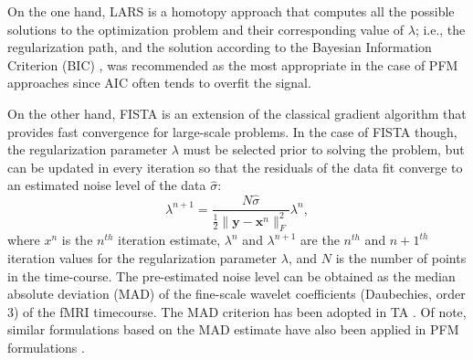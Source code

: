 On the one hand, LARS is a homotopy approach that computes all the possible
solutions to the optimization problem and their corresponding value of
$\lambda$; i.e., the regularization path, and the solution according to the
Bayesian Information Criterion (BIC)
\citep{Schwarz1978EstimatingDimensionModel}, was recommended as the most
appropriate in the case of PFM approaches since AIC often tends to overfit the
signal\citep{Gaudes2013Paradigmfreemapping,CaballeroGaudes2019deconvolutionalgorithmmulti}.

On the other hand, FISTA is an extension of the classical gradient algorithm
that provides fast convergence for large-scale problems. In the case of FISTA
though, the regularization parameter $\lambda$ must be selected prior to solving
the problem, but can be updated in every iteration so that the residuals of the
data fit converge to an estimated noise level of the data $\hat{\sigma}$:
\begin{equation}
    \lambda^{n+1} = \frac{N \hat{\sigma}}{\frac{1}{2} \| \mathbf{y} - \mathbf{x}^n \|_F^2} \lambda^n,
\label{eq:std}
\end{equation}
where $x^n$ is the $n^{th}$ iteration estimate, $\lambda^n$ and $\lambda^{n+1}$
are the $n^{th}$ and $n+1^{th}$ iteration values for the regularization
parameter $\lambda$, and $N$ is the number of points in the time-course. The
pre-estimated noise level can be obtained as the median absolute deviation (MAD)
of the fine-scale wavelet coefficients (Daubechies, order 3) of the fMRI
timecourse. The MAD criterion has been adopted in TA
\citep{Karahanoglu2013TotalactivationfMRI}. Of note, similar formulations based
on the MAD estimate have also been applied in PFM formulations
\citep{Gaudes2012Structuredsparsedeconvolution,Gaudes2011MorphologicalPFM}.

